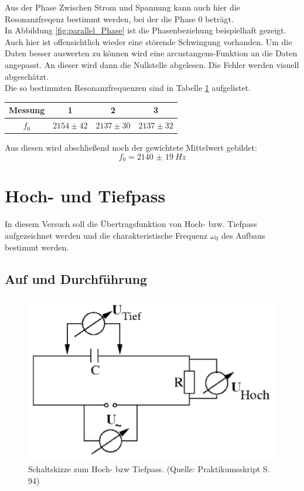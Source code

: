 \documentclass[12pt,a4paper]{article}
\begin{document}
Aus der Phase Zwischen Strom und Spannung kann auch hier die Resonanzfreqenz bestimmt werden, bei der die Phase 0 beträgt.\\
In Abbildung \ref{fig:parallel_Phase} ist die Phasenbeziehung beispielhaft gezeigt. Auch hier ist offensichtlich wieder eine störende Schwingung vorhanden. Um die Daten besser auswerten zu können wird eine arcustangens-Funktion an die Daten angepasst. An dieser wird dann die Nullstelle abgelesen.
Die Fehler werden visuell abgeschätzt.\\
Die so bestimmten Resonanzfrequenzen sind in Tabelle  \ref{tab:Parallel_Phase} aufgelistet.

\begin{table}
\centering
\begin{tabular}{|c|c|c|c|}
\hline
Messung & 1 & 2 & 3\\
\hline
$f_0$ & $2154\pm 42$ &$ 2137\pm 30$ & $2137\pm 32$\\
\hline
\end{tabular}
\label{tab:Parallel_Phase}
\end{table}

Aus diesen wird abschließend noch der gewichtete Mittelwert gebildet:
\begin{equation}
f_0 = \SI{2140(19)}{Hz}
\end{equation}


\section{Hoch- und Tiefpass}

In diesem Versuch soll die Übertragsfunktion von Hoch- bzw. Tiefpass aufgezeichnet werden und die charakteristische Frequenz $\omega_0$ des Aufbaus bestimmt werden.

\subsection{Auf und Durchführung}

\begin{figure}
\centering
\includegraphics[scale=1.0]{Bilder/AufbauHochTief.png}
\caption{Schaltskizze zum Hoch- bzw Tiefpass. (Quelle: Praktikumsskript S. 94)}
\label{fig:AufbauHochTief}
\end{figure}
\end{document}
